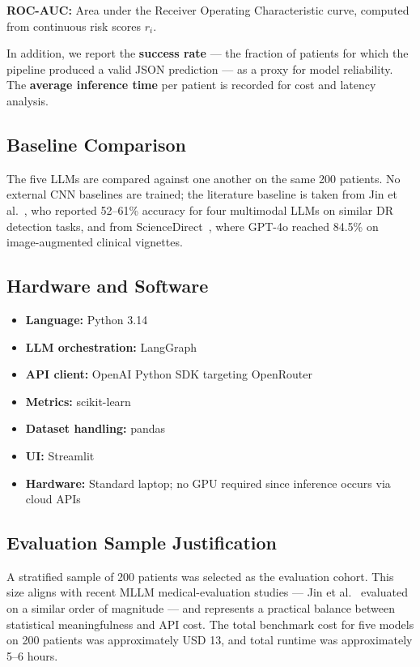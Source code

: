 \documentclass[11pt,a4paper]{article}
\begin{document}
\textbf{ROC-AUC:} Area under the Receiver Operating Characteristic curve, computed from continuous risk scores $r_i$.

In addition, we report the \textbf{success rate} --- the fraction of patients for which the pipeline produced a valid JSON prediction --- as a proxy for model reliability. The \textbf{average inference time} per patient is recorded for cost and latency analysis.

\subsection{Baseline Comparison}

The five LLMs are compared against one another on the same 200 patients. No external CNN baselines are trained; the literature baseline is taken from Jin et al.~\cite{jin2025mllm}, who reported 52--61\% accuracy for four multimodal LLMs on similar DR detection tasks, and from ScienceDirect~\cite{sciencedirect2024}, where GPT-4o reached 84.5\% on image-augmented clinical vignettes.

\subsection{Hardware and Software}

\begin{itemize}
    \item \textbf{Language:} Python 3.14
    \item \textbf{LLM orchestration:} LangGraph
    \item \textbf{API client:} OpenAI Python SDK targeting OpenRouter
    \item \textbf{Metrics:} scikit-learn
    \item \textbf{Dataset handling:} pandas
    \item \textbf{UI:} Streamlit
    \item \textbf{Hardware:} Standard laptop; no GPU required since inference occurs via cloud APIs
\end{itemize}

\subsection{Evaluation Sample Justification}

A stratified sample of 200 patients was selected as the evaluation cohort. This size aligns with recent MLLM medical-evaluation studies --- Jin et al.~\cite{jin2025mllm} evaluated on a similar order of magnitude --- and represents a practical balance between statistical meaningfulness and API cost. The total benchmark cost for five models on 200 patients was approximately USD 13, and total runtime was approximately 5--6 hours.
\end{document}
